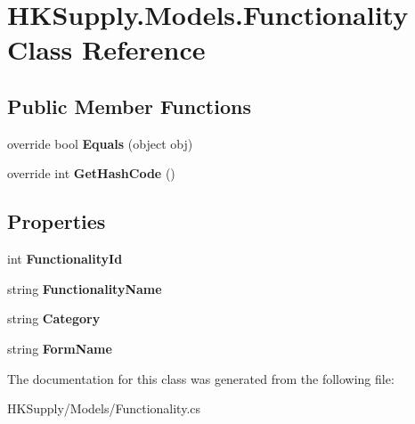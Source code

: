 \hypertarget{class_h_k_supply_1_1_models_1_1_functionality}{}\section{H\+K\+Supply.\+Models.\+Functionality Class Reference}
\label{class_h_k_supply_1_1_models_1_1_functionality}
\subsection*{Public Member Functions}
\begin{DoxyCompactItemize}
\item 
\mbox{\label{class_h_k_supply_1_1_models_1_1_functionality_a335165c2bd6cbc5ff6d314cb03d70246}} 
override bool {\bfseries Equals} (object obj)
\item 
\mbox{\label{class_h_k_supply_1_1_models_1_1_functionality_ad460dce69ed01477901c5ac1e2abcd89}} 
override int {\bfseries Get\+Hash\+Code} ()
\end{DoxyCompactItemize}
\subsection*{Properties}
\begin{DoxyCompactItemize}
\item 
\mbox{\label{class_h_k_supply_1_1_models_1_1_functionality_a1d4863a80797dc71a680cdfb1981622f}} 
int {\bfseries Functionality\+Id}
\item 
\mbox{\label{class_h_k_supply_1_1_models_1_1_functionality_ab33c1a395b442de1c096c8beb00ab968}} 
string {\bfseries Functionality\+Name}
\item 
\mbox{\label{class_h_k_supply_1_1_models_1_1_functionality_a435984473f4cb370eab0a72efa561c1a}} 
string {\bfseries Category}
\item 
\mbox{\label{class_h_k_supply_1_1_models_1_1_functionality_a23ca4563c106add51c24a2741bf946a1}} 
string {\bfseries Form\+Name}
\end{DoxyCompactItemize}


The documentation for this class was generated from the following file\+:\begin{DoxyCompactItemize}
\item 
H\+K\+Supply/\+Models/Functionality.\+cs\end{DoxyCompactItemize}
